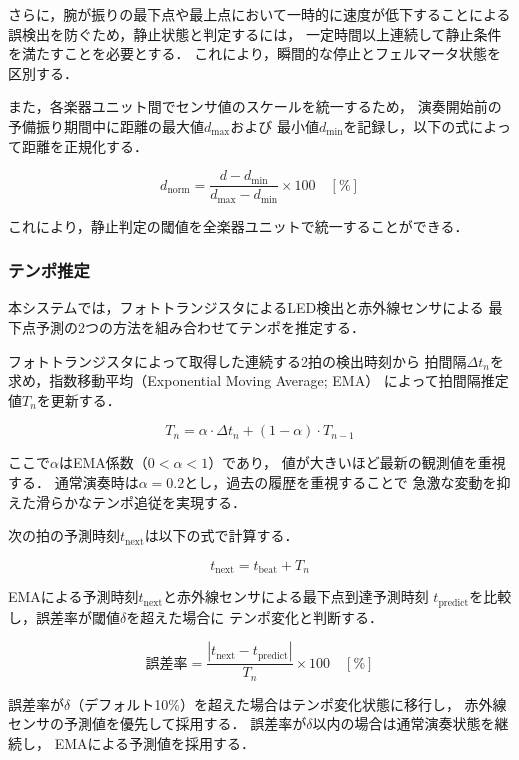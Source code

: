 \documentclass[lualatex,book,paper=a4paper,jafontsize=11.5pt,jafontscale=1.05,oneside]{jlreq}
\begin{document}
さらに，腕が振りの最下点や最上点において一時的に速度が低下することによる
誤検出を防ぐため，静止状態と判定するには，
一定時間以上連続して静止条件を満たすことを必要とする．
これにより，瞬間的な停止とフェルマータ状態を区別する．

また，各楽器ユニット間でセンサ値のスケールを統一するため，
演奏開始前の予備振り期間中に距離の最大値$d_{\max}$および
最小値$d_{\min}$を記録し，以下の式によって距離を正規化する．

\begin{equation}
  d_{\text{norm}} = \frac{d - d_{\min}}{d_{\max} - d_{\min}} \times 100 \quad [\%]
\end{equation}

これにより，静止判定の閾値を全楽器ユニットで統一することができる．

\subsubsection*{テンポ推定}
本システムでは，フォトトランジスタによるLED検出と赤外線センサによる
最下点予測の2つの方法を組み合わせてテンポを推定する．

フォトトランジスタによって取得した連続する2拍の検出時刻から
拍間隔$\Delta t_n$を求め，指数移動平均（Exponential Moving Average; EMA）
によって拍間隔推定値$T_n$を更新する．

\begin{equation}
  T_n = \alpha \cdot \Delta t_n + (1 - \alpha) \cdot T_{n-1}
\end{equation}

ここで$\alpha$はEMA係数（$0 < \alpha < 1$）であり，
値が大きいほど最新の観測値を重視する．
通常演奏時は$\alpha = 0.2$とし，過去の履歴を重視することで
急激な変動を抑えた滑らかなテンポ追従を実現する．

次の拍の予測時刻$t_{\text{next}}$は以下の式で計算する．

\begin{equation}
  t_{\text{next}} = t_{\text{beat}} + T_n
\end{equation}

EMAによる予測時刻$t_{\text{next}}$と赤外線センサによる最下点到達予測時刻
$t_{\text{predict}}$を比較し，誤差率が閾値$\delta$を超えた場合に
テンポ変化と判断する．

\begin{equation}
  \text{誤差率} = \frac{|t_{\text{next}} - t_{\text{predict}}|}{T_n} \times 100 \quad [\%]
\end{equation}

誤差率が$\delta$（デフォルト10\%）を超えた場合はテンポ変化状態に移行し，
赤外線センサの予測値を優先して採用する．
誤差率が$\delta$以内の場合は通常演奏状態を継続し，
EMAによる予測値を採用する．
\end{document}
